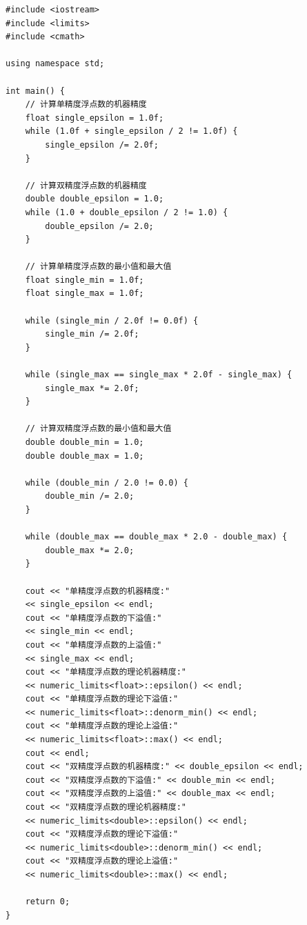 \documentclass[UTF8,ctexart,a4paper,11pt,openany]{article}
\theoremstyle{definition}
\begin{document}
\begin{lstlisting}[aboveskip=0pt]
#include <iostream>
#include <limits>
#include <cmath>

using namespace std;

int main() {
    // 计算单精度浮点数的机器精度
    float single_epsilon = 1.0f;
    while (1.0f + single_epsilon / 2 != 1.0f) {
        single_epsilon /= 2.0f;
    }

    // 计算双精度浮点数的机器精度
    double double_epsilon = 1.0;
    while (1.0 + double_epsilon / 2 != 1.0) {
        double_epsilon /= 2.0;
    }

    // 计算单精度浮点数的最小值和最大值
    float single_min = 1.0f;
    float single_max = 1.0f;

    while (single_min / 2.0f != 0.0f) {
        single_min /= 2.0f;
    }

    while (single_max == single_max * 2.0f - single_max) {
        single_max *= 2.0f;
    }

    // 计算双精度浮点数的最小值和最大值
    double double_min = 1.0;
    double double_max = 1.0;

    while (double_min / 2.0 != 0.0) {
        double_min /= 2.0;
    }

    while (double_max == double_max * 2.0 - double_max) {
        double_max *= 2.0;
    }

    cout << "单精度浮点数的机器精度:" 
    << single_epsilon << endl;
    cout << "单精度浮点数的下溢值:" 
    << single_min << endl;
    cout << "单精度浮点数的上溢值:" 
    << single_max << endl;
    cout << "单精度浮点数的理论机器精度:" 
    << numeric_limits<float>::epsilon() << endl;
    cout << "单精度浮点数的理论下溢值:" 
    << numeric_limits<float>::denorm_min() << endl;
    cout << "单精度浮点数的理论上溢值:" 
    << numeric_limits<float>::max() << endl;
    cout << endl;
    cout << "双精度浮点数的机器精度:" << double_epsilon << endl;
    cout << "双精度浮点数的下溢值:" << double_min << endl;
    cout << "双精度浮点数的上溢值:" << double_max << endl;
    cout << "双精度浮点数的理论机器精度:" 
    << numeric_limits<double>::epsilon() << endl;
    cout << "双精度浮点数的理论下溢值:" 
    << numeric_limits<double>::denorm_min() << endl;
    cout << "双精度浮点数的理论上溢值:" 
    << numeric_limits<double>::max() << endl;

    return 0;
}        
\end{lstlisting}

\clearpage



\end{document}
